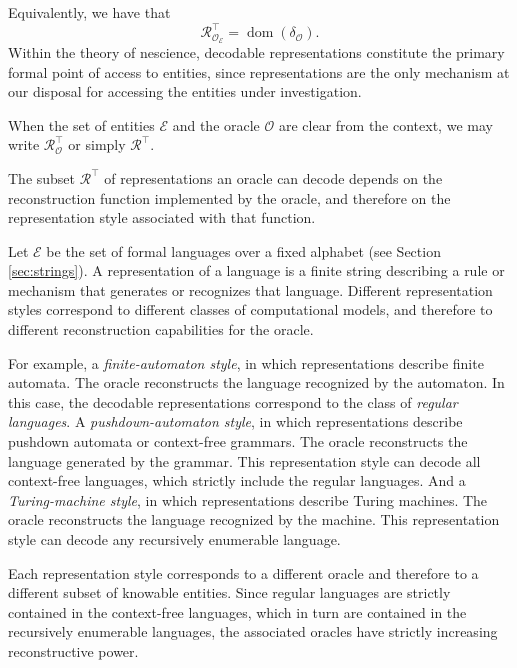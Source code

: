 \noindent
Equivalently, we have that
\[
\mathcal{R}_{\mathcal{O}_{\mathcal{E}}}^{\top}
=
\operatorname{dom}(\delta_{\mathcal O}).
\]
Within the theory of nescience, decodable representations constitute the primary formal point of access to entities, since representations are the only mechanism at our disposal for accessing the entities under investigation.

\begin{notation}
When the set of entities $\mathcal{E}$ and the oracle $\mathcal{O}$ are clear from the context, we may write
$\mathcal{R}_{\mathcal O}^{\top}$ or simply $\mathcal{R}^{\top}$.
\end{notation}

The subset $\mathcal{R}^{\top}$ of representations an oracle can decode depends on the reconstruction function implemented by the oracle, and therefore on the representation style associated with that function.

\begin{example}
\label{ex:formal_languages_oracles}
Let $\mathcal{E}$ be the set of formal languages over a fixed alphabet (see Section \ref{sec:strings}). A representation of a language is a finite string describing a rule or mechanism that generates or recognizes that language. Different representation styles correspond to different classes of computational models, and therefore to different reconstruction capabilities for the oracle.

For example, a \emph{finite-automaton style}, in which representations describe finite automata. The oracle reconstructs the language recognized by the automaton. In this case, the decodable representations correspond to the class of \emph{regular languages}. A \emph{pushdown-automaton style}, in which representations describe pushdown automata or context-free grammars. The oracle reconstructs the language generated by the grammar. 
This representation style can decode all context-free languages, which strictly include the regular languages.
And a \emph{Turing-machine style}, in which representations describe Turing machines. 
The oracle reconstructs the language recognized by the machine.  This representation style can decode any recursively enumerable language.

Each representation style corresponds to a different oracle and therefore to a different subset of knowable entities. Since regular languages are strictly contained in the context-free languages, which in turn are contained in the recursively enumerable languages, the associated oracles have strictly increasing reconstructive power.
\end{example}

